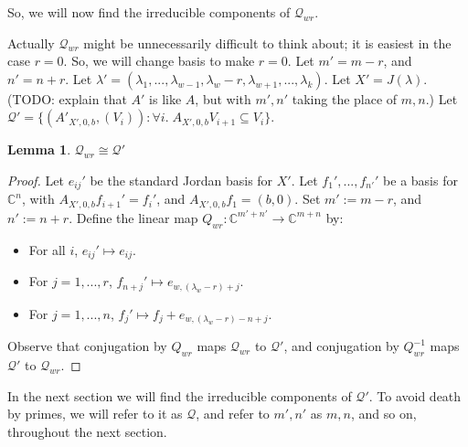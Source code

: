 \documentclass[12pt,psamsfonts]{article}
\newtheorem{lemma}[theorem]{Lemma}
\begin{document}
So, we will now find the irreducible components of \(\mathcal{Q}_{wr}\).
\par Actually \(\mathcal{Q}_{wr}\) might be unnecessarily difficult to think about; it is easiest in the case \(r = 0\).
So, we will change basis to make \(r = 0\).
Let \(m' = m - r\), and \(n' = n + r\).
Let \(\lambda' = (\lambda_1, ..., \lambda_{w - 1}, \lambda_w - r, \lambda_{w + 1}, ..., \lambda_k)\).
Let \(X' = J(\lambda)\).
(TODO: explain that \(A'\) is like \(A\), but with \(m',n'\) taking the place of \(m,n\).)
Let \(\mathcal{Q}' = \{(A'_{X', 0, b}, (V_i)) : \forall i. \; A_{X', 0, b} V_{i + 1} \subseteq V_i\}\).
\begin{lemma}\label{a_zero}
    \(\mathcal{Q}_{wr} \cong \mathcal{Q}'\)
\end{lemma}
\begin{proof}
    Let \(e_{ij}'\) be the standard Jordan basis for \(X'\).
    Let \(f_1', ..., f_{n'}'\) be a basis for \(\mathbb{C}^n\), with \(A_{X', 0, b} f_{i + 1}' = f_i'\), and \(A_{X', 0, b} f_1 = (b, 0)\).
    Set \(m' := m - r\), and \(n' := n + r\).
    Define the linear map \(Q_{wr} : \mathbb{C}^{m' + n'} \to \mathbb{C}^{m + n}\) by:
    \begin{itemize}
        \item For all \(i\), \(e_{ij}' \mapsto e_{ij}\).
        \item For \(j = 1, ..., r\), \(f_{n + j}' \mapsto e_{w,(\lambda_w - r) + j}\).
        \item For \(j = 1, ..., n\), \(f_j' \mapsto f_j + e_{w, (\lambda_w - r) - n + j}\).
    \end{itemize}
    Observe that conjugation by \(Q_{wr}\) maps \(\mathcal{Q}_{wr}\) to \(\mathcal{Q}'\), and conjugation by \(Q_{wr}^{-1}\) maps \(\mathcal{Q}'\) to \(\mathcal{Q}_{wr}\).
\end{proof}
In the next section we will find the irreducible components of \(\mathcal{Q}'\).
To avoid death by primes, we will refer to it as \(\mathcal{Q}\), and refer to \(m',n'\) as \(m,n\), and so on, throughout the next section.
\end{document}
